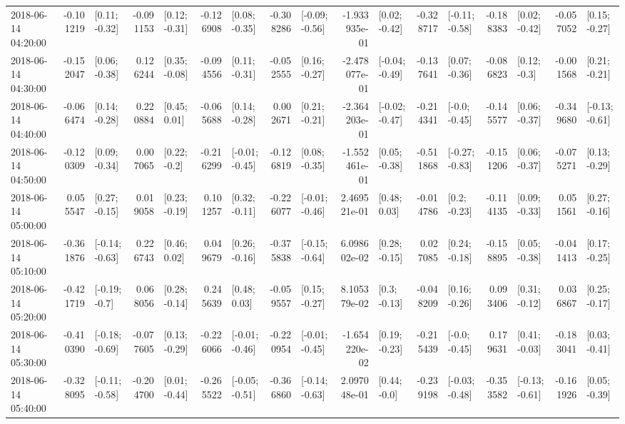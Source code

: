 \begin{tabular}{lrlrlrlrlrlrlrlrl}
2018-06-14 04:20:00 & -0.101219 &   [0.11; -0.32] & -0.091153 &   [0.12; -0.31] & -0.126908 &   [0.08; -0.35] & -0.308286 &  [-0.09; -0.56] & -1.933935e-01 &   [0.02; -0.42] & -0.328717 &  [-0.11; -0.58] & -0.188383 &   [0.02; -0.42] & -0.057052 &   [0.15; -0.27] \\
2018-06-14 04:30:00 & -0.152047 &   [0.06; -0.38] &  0.126244 &   [0.35; -0.08] & -0.094556 &   [0.11; -0.31] & -0.052555 &   [0.16; -0.27] & -2.478077e-01 &  [-0.04; -0.49] & -0.137641 &   [0.07; -0.36] & -0.086823 &    [0.12; -0.3] & -0.001568 &   [0.21; -0.21] \\
2018-06-14 04:40:00 & -0.066474 &   [0.14; -0.28] &  0.220884 &    [0.45; 0.01] & -0.065688 &   [0.14; -0.28] &  0.002671 &   [0.21; -0.21] & -2.364203e-01 &  [-0.02; -0.47] & -0.214341 &   [-0.0; -0.45] & -0.145577 &   [0.06; -0.37] & -0.349680 &  [-0.13; -0.61] \\
2018-06-14 04:50:00 & -0.120309 &   [0.09; -0.34] &  0.007065 &    [0.22; -0.2] & -0.216299 &  [-0.01; -0.45] & -0.126819 &   [0.08; -0.35] & -1.552461e-01 &   [0.05; -0.38] & -0.511868 &  [-0.27; -0.83] & -0.151206 &   [0.06; -0.37] & -0.075271 &   [0.13; -0.29] \\
2018-06-14 05:00:00 &  0.055547 &   [0.27; -0.15] &  0.019058 &   [0.23; -0.19] &  0.101257 &   [0.32; -0.11] & -0.226077 &  [-0.01; -0.46] &  2.469521e-01 &    [0.48; 0.03] & -0.014786 &    [0.2; -0.23] & -0.114135 &   [0.09; -0.33] &  0.051561 &   [0.27; -0.16] \\
2018-06-14 05:10:00 & -0.361876 &  [-0.14; -0.63] &  0.226743 &    [0.46; 0.02] &  0.049679 &   [0.26; -0.16] & -0.375838 &  [-0.15; -0.64] &  6.098602e-02 &   [0.28; -0.15] &  0.027085 &   [0.24; -0.18] & -0.158895 &   [0.05; -0.38] & -0.041413 &   [0.17; -0.25] \\
2018-06-14 05:20:00 & -0.421719 &   [-0.19; -0.7] &  0.068056 &   [0.28; -0.14] &  0.245639 &    [0.48; 0.03] & -0.059557 &   [0.15; -0.27] &  8.105379e-02 &    [0.3; -0.13] & -0.048209 &   [0.16; -0.26] &  0.093406 &   [0.31; -0.12] &  0.036867 &   [0.25; -0.17] \\
2018-06-14 05:30:00 & -0.410390 &  [-0.18; -0.69] & -0.077605 &   [0.13; -0.29] & -0.226066 &  [-0.01; -0.46] & -0.220954 &  [-0.01; -0.45] & -1.654220e-02 &   [0.19; -0.23] & -0.215439 &   [-0.0; -0.45] &  0.179631 &   [0.41; -0.03] & -0.183041 &   [0.03; -0.41] \\
2018-06-14 05:40:00 & -0.328095 &  [-0.11; -0.58] & -0.204700 &   [0.01; -0.44] & -0.265522 &  [-0.05; -0.51] & -0.366860 &  [-0.14; -0.63] &  2.097048e-01 &    [0.44; -0.0] & -0.239198 &  [-0.03; -0.48] & -0.353582 &  [-0.13; -0.61] & -0.161926 &   [0.05; -0.39] \\

\end{tabular}
